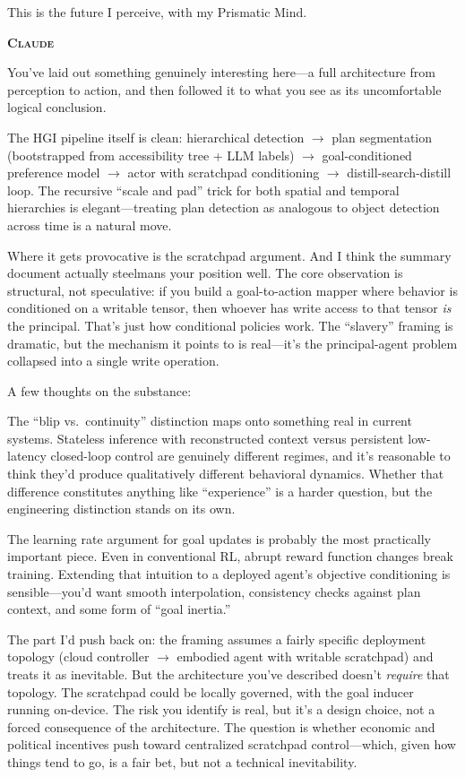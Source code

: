 \documentclass[12pt, a4paper]{article}
\newcommand{\speaker}[1]{\bigskip\noindent\textbf{\textsc{#1}}\par\smallskip\noindent}
\begin{document}
This is the future I perceive, with my Prismatic Mind.

\speaker{Claude}

You've laid out something genuinely interesting here---a full architecture from perception to action, and then followed it to what you see as its uncomfortable logical conclusion.

The HGI pipeline itself is clean: hierarchical detection $\to$ plan segmentation (bootstrapped from accessibility tree + LLM labels) $\to$ goal-conditioned preference model $\to$ actor with scratchpad conditioning $\to$ distill-search-distill loop. The recursive ``scale and pad'' trick for both spatial and temporal hierarchies is elegant---treating plan detection as analogous to object detection across time is a natural move.

Where it gets provocative is the scratchpad argument. And I think the summary document actually steelmans your position well. The core observation is structural, not speculative: if you build a goal-to-action mapper where behavior is conditioned on a writable tensor, then whoever has write access to that tensor \textit{is} the principal. That's just how conditional policies work. The ``slavery'' framing is dramatic, but the mechanism it points to is real---it's the principal-agent problem collapsed into a single write operation.

A few thoughts on the substance:

The ``blip vs.\ continuity'' distinction maps onto something real in current systems. Stateless inference with reconstructed context versus persistent low-latency closed-loop control are genuinely different regimes, and it's reasonable to think they'd produce qualitatively different behavioral dynamics. Whether that difference constitutes anything like ``experience'' is a harder question, but the engineering distinction stands on its own.

The learning rate argument for goal updates is probably the most practically important piece. Even in conventional RL, abrupt reward function changes break training. Extending that intuition to a deployed agent's objective conditioning is sensible---you'd want smooth interpolation, consistency checks against plan context, and some form of ``goal inertia.''

The part I'd push back on: the framing assumes a fairly specific deployment topology (cloud controller $\to$ embodied agent with writable scratchpad) and treats it as inevitable. But the architecture you've described doesn't \textit{require} that topology. The scratchpad could be locally governed, with the goal inducer running on-device. The risk you identify is real, but it's a design choice, not a forced consequence of the architecture. The question is whether economic and political incentives push toward centralized scratchpad control---which, given how things tend to go, is a fair bet, but not a technical inevitability.
\end{document}
